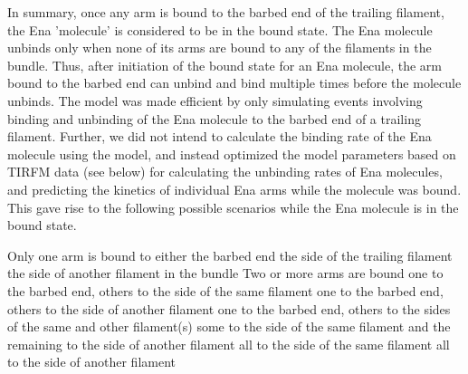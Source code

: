 In summary, once any arm is bound to the barbed end of the trailing filament, the Ena 'molecule' is considered to be in the bound state. The Ena molecule unbinds only when none of its arms are bound to any of the filaments in the bundle. Thus, after initiation of the bound state for an Ena molecule, the arm bound to the barbed end can unbind and bind multiple times before the molecule unbinds.
The model was made efficient by only simulating events involving binding and unbinding of the Ena molecule to the barbed end of a trailing filament. Further, we did not intend to calculate the binding rate of the Ena molecule using the model, and instead optimized the model parameters based on TIRFM data (see below) for calculating the unbinding rates of Ena molecules, and predicting the kinetics of individual Ena arms while the molecule was bound. This gave rise to the following possible scenarios while the Ena molecule is in the bound state.
\begin{outline}[enumerate]
   \1 Only one arm is bound to either
      \2 the barbed end
      \2 the side of the trailing filament
      \2 the side of another filament in the bundle
   \1 Two or more arms are bound
      \2 one to the barbed end, others to the side of the same filament
      \2 one to the barbed end, others to the side of another filament
      \2 one to the barbed end, others to the sides of the same and other filament(s)
      \2 some to the side of the same filament and the remaining to the side of another filament
      \2 all to the side of the same filament
      \2 all to the side of another filament
\end{outline}

